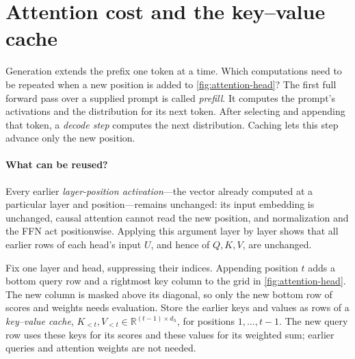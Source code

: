 \documentclass[11pt,twoside]{article}
\newcommand{\R}{\mathbb R}
\theoremstyle{plain}
\theoremstyle{definition}
\theoremstyle{remark}
\begin{document}
\section{Attention cost and the key--value cache}
\label{sec:attention-cost}

Generation extends the prefix one token at a time. Which computations need
to be repeated when a new position is added to \cref{fig:attention-head}?
The first full forward pass over a supplied prompt is called \emph{prefill}.
It computes the prompt's activations and the distribution for its next token.
After selecting and appending that token, a \emph{decode step} computes the
next distribution. Caching lets this step advance only the new position.

\paragraph{What can be reused?}
Every earlier \emph{layer-position activation}---the vector already computed
at a particular layer and position---remains unchanged: its input embedding
is unchanged, causal attention cannot read the new position, and normalization
and the FFN act positionwise. Applying this argument layer by layer shows
that all earlier rows of each head's input $U$, and hence of $Q,K,V$, are unchanged.

Fix one layer and head, suppressing their indices. Appending position $t$
adds a bottom query row and a rightmost key column to the grid in
\cref{fig:attention-head}. The new column is masked above its diagonal,
so only the new bottom row of scores and weights needs evaluation.
Store the earlier keys and values as rows of a \emph{key--value cache},
$K_{<t},V_{<t}\in\R^{(t-1)\times d_h}$, for positions $1,\ldots,t-1$.
The new query row uses these keys for its scores and these values for its
weighted sum; earlier queries and attention weights are not needed.
\end{document}
